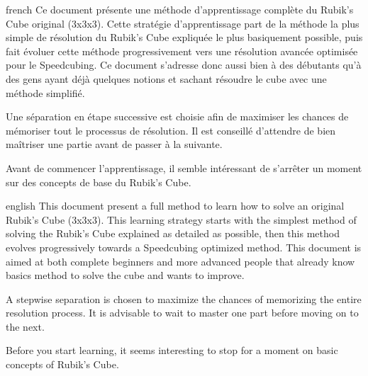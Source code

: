\documentclass[0_Main.tex]{subfiles}
\begin{document}
\begin{shownto}{french}
Ce document présente une méthode d'apprentissage complète du Rubik's Cube original (3x3x3). Cette stratégie d'apprentissage part de la méthode la plus simple de résolution du Rubik's Cube expliquée le plus basiquement possible, puis fait évoluer cette méthode progressivement vers une résolution avancée optimisée pour le Speedcubing. Ce document s'adresse donc aussi bien à des débutants qu'à des gens ayant déjà quelques notions et sachant résoudre le cube avec une méthode simplifié.

Une séparation en étape successive est choisie afin de maximiser les chances de mémoriser tout le processus de résolution. Il est conseillé d’attendre de bien maîtriser une partie avant de passer à la suivante.

Avant de commencer l’apprentissage, il semble intéressant de s’arrêter un moment sur des concepts de base du Rubik’s Cube.
\end{shownto}

\begin{shownto}{english}
This document present a full method to learn how to solve an original Rubik's Cube (3x3x3). This learning strategy starts with the simplest method of solving the Rubik's Cube explained as detailed as possible, then this method evolves progressively towards a Speedcubing optimized method. This document is aimed at both complete beginners and more advanced people that already know basics method to solve the cube and wants to improve.

A stepwise separation is chosen to maximize the chances of memorizing the entire resolution process. It is advisable to wait to master one part before moving on to the next.

Before you start learning, it seems interesting to stop for a moment on basic concepts of Rubik's Cube.
\end{shownto}
\end{document}
